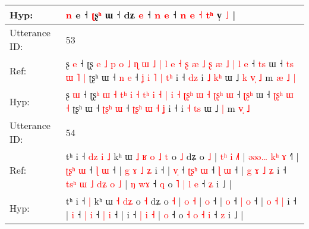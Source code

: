 \documentclass[10pt]{article}
\DeclareRobustCommand{\hl}[1]{{\textcolor{red}{#1}}}
\begin{document}
\begin{longtable}{ll}
 \\
Hyp: & \hl{n} e ˧ \hl{ʈ}ʂ\hl{ʰ} ɯ ˧ dʑ \hl{e} ˧\hl{}\hl{} \hl{}\hl{n} \hl{e} ˧ \hl{n} \hl{}\hl{e} \hl{˧} \hl{}\hl{t}\hl{ʰ} v̩\hl{}\hl{}\hl{}\hl{}\hl{}\hl{}\hl{}\hl{}\hl{}\hl{}\hl{}\hl{}\hl{} \hl{}\hl{˩} |
 \\
\midrule
Utterance ID: & 53 \\
Ref: & ʂ \hl{e} ˧ ʈʂ\hl{ }\hl{e} \hl{˩} \hl{p} \hl{o}\hl{ }\hl{˩} \hl{ɳ} \hl{ɯ} \hl{˩}\hl{ }\hl{|} \hl{l} \hl{e} \hl{˧} \hl{ʂ} \hl{æ} \hl{˩}\hl{ }\hl{ʂ} \hl{æ} \hl{˩} \hl{|}\hl{ }\hl{l} \hl{e} ˧ \hl{}\hl{t}\hl{s} ɯ ˧ \hl{t}\hl{s}\hl{ }\hl{ɯ} \hl{˥} \hl{|} ʈʂʰ ɯ ˧ \hl{}\hl{}\hl{n} \hl{e} ˧ \hl{ʝ}\hl{ }\hl{i} \hl{˥} \hl{|} \hl{t}\hl{ʰ} i ˧\hl{ }\hl{d}\hl{z} i \hl{˩} \hl{k}\hl{ʰ} ɯ ˩\hl{ }\hl{k}\hl{ }\hl{v}\hl{̩} \hl{˩} m \hl{æ}\hl{ }\hl{˩} \hl{|}
 \\
Hyp: & ʂ \hl{ɯ} ˧ ʈʂ\hl{}\hl{ʰ} \hl{ɯ} \hl{˧} \hl{}\hl{t}\hl{ʰ} \hl{i} \hl{˧} \hl{}\hl{t}\hl{ʰ} \hl{i} \hl{˧} \hl{|} \hl{i} \hl{˧} \hl{ʈ}\hl{ʂ}\hl{ʰ} \hl{ɯ} \hl{˧} \hl{ʈ}\hl{ʂ}\hl{ʰ} \hl{ɯ} ˧ \hl{ʈ}\hl{ʂ}\hl{ʰ} ɯ ˧ \hl{}\hl{ʈ}\hl{ʂ}\hl{ʰ} \hl{ɯ} \hl{˧} ʈʂʰ ɯ ˧ \hl{ʈ}\hl{ʂ}\hl{ʰ} \hl{ɯ} ˧ \hl{ʈ}\hl{ʂ}\hl{ʰ} \hl{ɯ} \hl{˧} \hl{}\hl{ʝ} i ˧\hl{}\hl{}\hl{} i \hl{˧} \hl{t}\hl{s} ɯ ˩\hl{}\hl{}\hl{}\hl{}\hl{} \hl{|} m \hl{}\hl{v}\hl{̩} \hl{˩}
 \\
\midrule
Utterance ID: & 54 \\
Ref: & tʰ i ˧\hl{ }\hl{d}\hl{z}\hl{ }\hl{i} \hl{˩} kʰ ɯ\hl{ }\hl{˩}\hl{ }\hl{ʁ} \hl{o} \hl{˩}\hl{ }\hl{t} o \hl{˩} dʑ o \hl{˩} |\hl{ }\hl{t}\hl{ʰ} \hl{i} \hl{˩}\hl{˥} |\hl{ }\hl{ə}\hl{ə}\hl{ə}\hl{…}\hl{ }\hl{k}\hl{ʰ} \hl{ɤ} ˧\hl{˥} |\hl{ }\hl{ʈ}\hl{ʂ}\hl{ʰ} \hl{ɯ} ˧ \hl{ɭ} \hl{ɯ} ˧ |\hl{ }\hl{g} \hl{ɤ} \hl{˩} \hl{ʑ} i ˧ | \hl{v}\hl{̩} ˧ \hl{ʈ}\hl{ʂ}\hl{ʰ} \hl{ɯ} ˧ \hl{ɭ} \hl{ɯ} ˧ |\hl{ }\hl{g}\hl{ }\hl{ɤ}\hl{ }\hl{˩}\hl{ }\hl{ʑ} i ˧\hl{ }\hl{t}\hl{s}\hl{ʰ}\hl{ }\hl{ɯ}\hl{ }\hl{˩} \hl{d}\hl{ʑ} \hl{o} \hl{˩} |\hl{ }\hl{ŋ} \hl{w}\hl{ɤ} ˧\hl{ }\hl{q} o \hl{˥} \hl{|} \hl{l} \hl{e} ˧ \hl{ʑ} i ˩ |
 \\
Hyp: & tʰ i ˧\hl{}\hl{}\hl{}\hl{}\hl{} \hl{|} kʰ ɯ\hl{}\hl{}\hl{}\hl{} \hl{˧} \hl{}\hl{d}\hl{ʑ} o \hl{˧} dʑ o \hl{˧} |\hl{}\hl{}\hl{} \hl{o} \hl{}\hl{˧} |\hl{}\hl{}\hl{}\hl{}\hl{}\hl{}\hl{}\hl{} \hl{o} ˧\hl{} |\hl{}\hl{}\hl{}\hl{} \hl{o} ˧ \hl{|} \hl{o} ˧ |\hl{}\hl{} \hl{o} \hl{˧} \hl{|} i ˧ | \hl{}\hl{i} ˧ \hl{}\hl{}\hl{|} \hl{i} ˧ \hl{|} \hl{i} ˧ |\hl{}\hl{}\hl{}\hl{}\hl{}\hl{}\hl{}\hl{} i ˧\hl{}\hl{}\hl{}\hl{}\hl{}\hl{}\hl{}\hl{} \hl{}\hl{|} \hl{i} \hl{˧} |\hl{}\hl{} \hl{}\hl{o} ˧\hl{}\hl{} o \hl{˧} \hl{o} \hl{˧} \hl{i} ˧ \hl{z} i ˩ |
 \\

\end{longtable}
\end{document}
